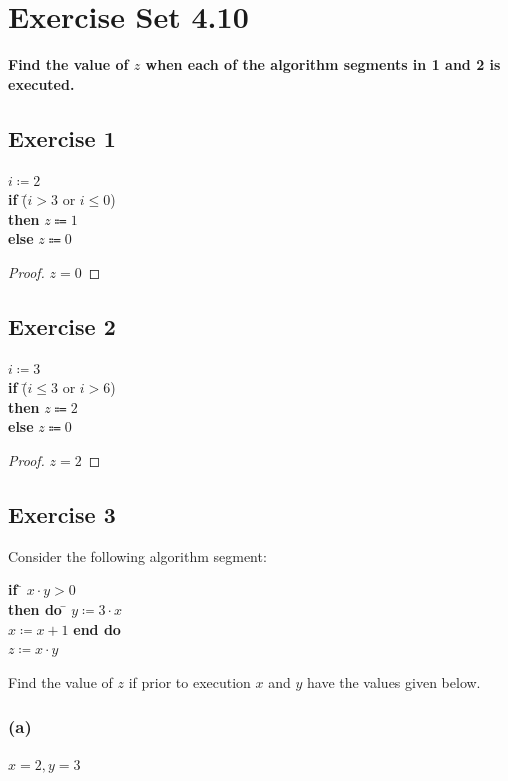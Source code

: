 \documentclass[14pt]{extarticle}
\newcommand{\cy}{\color{cyan}}
\begin{document}
\section{Exercise Set 4.10}
{\bf \cy Find the value of $z$ when each of the algorithm segments in 1 and 2 is executed.}

\subsection{Exercise 1}
\begin{tabbing}
$i \coloneqq 2$ \\
{\bf if} \= ($i > 3$ or $i \leq 0$) \\
         \> {\bf then} $z \Coloneqq 1$ \\
         \> {\bf else} $z \Coloneqq 0$
\end{tabbing}

\begin{proof}
$z = 0$
\end{proof}

\subsection{Exercise 2}
\begin{tabbing}
$i \coloneqq 3$ \\
{\bf if} \= ($i \leq 3$ or $i > 6$) \\
         \> {\bf then} $z \Coloneqq 2$ \\
         \> {\bf else} $z \Coloneqq 0$
\end{tabbing}

\begin{proof}
$z = 2$
\end{proof}

\subsection{Exercise 3}
Consider the following algorithm segment:
\begin{tabbing}
{\bf if} \= $x \cdot y > 0$ \\
         \> {\bf then do} \= $y \coloneqq 3\cdot x$ \\
         \>               \> $x \coloneqq x+1$ {\bf end do} \\
$z \coloneqq x \cdot y$
\end{tabbing}
Find the value of $z$ if prior to execution $x$ and $y$ have the values given below.

\subsubsection{(a)}
$x = 2, y = 3$
\end{document}
